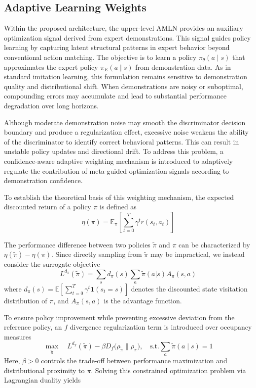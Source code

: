 \documentclass[journal]{IEEEtran}
\begin{document}
\subsection{Adaptive Learning Weights}
Within the proposed architecture, the upper-level AMLN provides an auxiliary optimization signal derived from expert demonstrations. 
This signal guides policy learning by capturing latent structural patterns in expert behavior beyond conventional action matching. The objective is to learn a policy $\pi_\theta(a \mid s)$ that approximates the expert policy $\pi_E(a \mid s)$ from demonstration data. As in standard imitation learning, this formulation remains sensitive to demonstration quality and distributional shift. When demonstrations are noisy or suboptimal, compounding errors may accumulate and lead to substantial performance degradation over long horizons\cite{ross2011reduction,foster2024behavior,vahabpour2024diverse}.

Although moderate demonstration noise may smooth the discriminator decision boundary and produce a regularization effect, excessive noise weakens the ability of the discriminator to identify correct behavioral patterns. This can result in unstable policy updates and directional drift. To address this problem, a confidence-aware adaptive weighting mechanism is introduced to adaptively regulate the contribution of meta-guided optimization signals according to demonstration confidence.

To establish the theoretical basis of this weighting mechanism, the expected discounted return of a policy $\pi$ is defined as
\begin{equation}
\eta (\pi)=\mathbb{E}_{\pi} \left[ \sum_{t=0}^{T} \gamma^t r(s_t,a_t) \right]
\end{equation}

The performance difference between two policies $\widetilde{\pi}$ and $\pi$ can be characterized by $\eta(\widetilde{\pi}) - \eta(\pi)$.
Since directly sampling from $\widetilde{\pi}$ may be impractical\cite{schulman2015trust}, we instead consider the surrogate objective
\begin{equation}
  L^{d_{\pi}}(\widetilde{\pi})=\sum_{s} d_{\pi}(s) \sum_{a} \widetilde{\pi}(a|s) A_{\pi}(s,a)
\end{equation}
where $d_{\pi}(s)=\mathbb{E}[\sum_{t=0}^{T} \gamma^t \mathbf{1}(s_t=s)]$ denotes the discounted state visitation distribution of $\pi$, and $A_\pi(s,a)$ is the advantage function.

To ensure policy improvement while preventing excessive deviation from the reference policy, an $f$ divergence regularization term is introduced over occupancy measures
\begin{equation}
  \max_{\widetilde{\pi}}\quad  L^{d_{\pi}}(\widetilde{\pi}) - \beta D_{f}\!\big(\rho_{\tilde{\pi}}\|\rho_{\pi}\big) ,
	\quad \text{s.t.} \sum_{a}\widetilde{\pi}(a\mid s)=1
\end{equation}
Here, $\beta > 0$ controls the trade-off between performance maximization and distributional proximity to $\pi$. Solving this constrained optimization problem via Lagrangian duality yields
\end{document}
